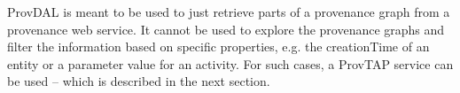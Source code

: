 ProvDAL is meant to be used to just retrieve parts of a provenance graph from a provenance web service. It cannot be used to explore the provenance graphs and filter the information based on specific properties, e.g. the creationTime of an entity or a parameter value for an activity. For such cases, a ProvTAP service can be used -- which is described in the next section.


